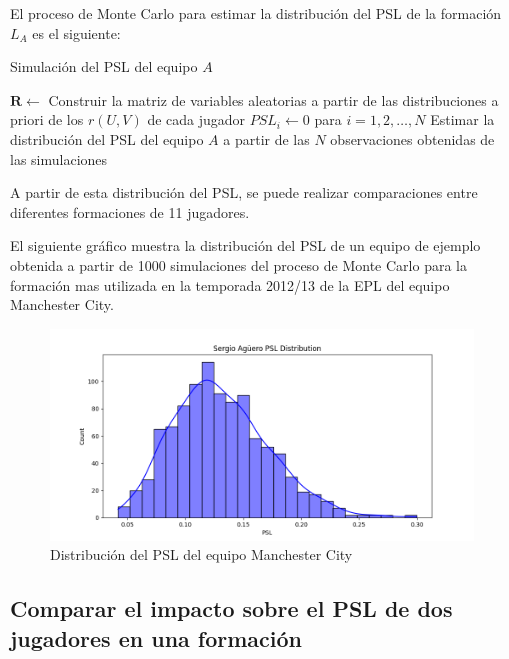 \documentclass[
  a4paper,
]{article}
\begin{document}
El proceso de Monte Carlo para estimar la distribución del PSL de la
formación \(L_A\) es el siguiente:

\begin{algorithm}[H]
\caption{Simulación del PSL del equipo $A$}\label{alg:cap}
\SetAlgoLined
{}
$\mathbf{R} \gets$ Construir la matriz de variables aleatorias a partir de las distribuciones a priori de los $r(U, V)$ de cada jugador\;
$PSL_i \gets 0$ para $i = 1, 2, \dots, N$\;
Estimar la distribución del PSL del equipo $A$ a partir de las $N$ observaciones obtenidas de las simulaciones\;
\end{algorithm}

A partir de esta distribución del PSL, se puede realizar comparaciones
entre diferentes formaciones de 11 jugadores.

El siguiente gráfico muestra la distribución del PSL de un equipo de
ejemplo obtenida a partir de 1000 simulaciones del proceso de Monte
Carlo para la formación mas utilizada en la temporada 2012/13 de la EPL
del equipo Manchester City.

\begin{figure}
  \includegraphics{recursos_pdf/graficos/sergio_aguero_psl_distribution.png}
    \caption{Distribución del PSL del equipo Manchester City}
\end{figure}

\hypertarget{comparar-el-impacto-sobre-el-psl-de-dos-jugadores-en-una-formaciuxf3n}{%
\subsection{Comparar el impacto sobre el PSL de dos jugadores en una
formación}\label{comparar-el-impacto-sobre-el-psl-de-dos-jugadores-en-una-formaciuxf3n}}
\end{document}
